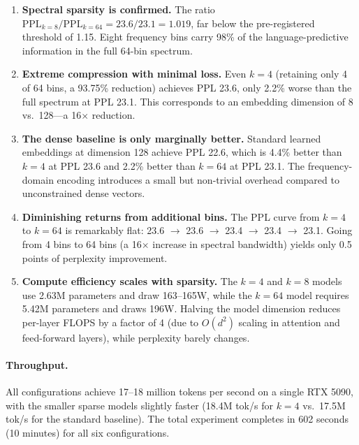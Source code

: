 \documentclass[10pt,twocolumn]{article}
\begin{document}
\begin{enumerate}[leftmargin=*,nosep]
    \item \textbf{Spectral sparsity is confirmed.} The ratio $\text{PPL}_{k=8} / \text{PPL}_{k=64} = 23.6 / 23.1 = 1.019$, far below the pre-registered threshold of 1.15. Eight frequency bins carry 98\% of the language-predictive information in the full 64-bin spectrum.

    \item \textbf{Extreme compression with minimal loss.} Even $k = 4$ (retaining only 4 of 64 bins, a 93.75\% reduction) achieves PPL 23.6, only 2.2\% worse than the full spectrum at PPL 23.1. This corresponds to an embedding dimension of 8 vs.\ 128---a 16$\times$ reduction.

    \item \textbf{The dense baseline is only marginally better.} Standard learned embeddings at dimension 128 achieve PPL 22.6, which is 4.4\% better than $k = 4$ at PPL 23.6 and 2.2\% better than $k = 64$ at PPL 23.1. The frequency-domain encoding introduces a small but non-trivial overhead compared to unconstrained dense vectors.

    \item \textbf{Diminishing returns from additional bins.} The PPL curve from $k = 4$ to $k = 64$ is remarkably flat: 23.6 $\rightarrow$ 23.6 $\rightarrow$ 23.4 $\rightarrow$ 23.4 $\rightarrow$ 23.1. Going from 4 bins to 64 bins (a 16$\times$ increase in spectral bandwidth) yields only 0.5 points of perplexity improvement.

    \item \textbf{Compute efficiency scales with sparsity.} The $k = 4$ and $k = 8$ models use 2.63M parameters and draw 163--165W, while the $k = 64$ model requires 5.42M parameters and draws 196W. Halving the model dimension reduces per-layer FLOPS by a factor of 4 (due to $O(d^2)$ scaling in attention and feed-forward layers), while perplexity barely changes.
\end{enumerate}

\paragraph{Throughput.} All configurations achieve 17--18 million tokens per second on a single RTX 5090, with the smaller sparse models slightly faster (18.4M tok/s for $k = 4$ vs.\ 17.5M tok/s for the standard baseline). The total experiment completes in 602 seconds (10 minutes) for all six configurations.
\end{document}

